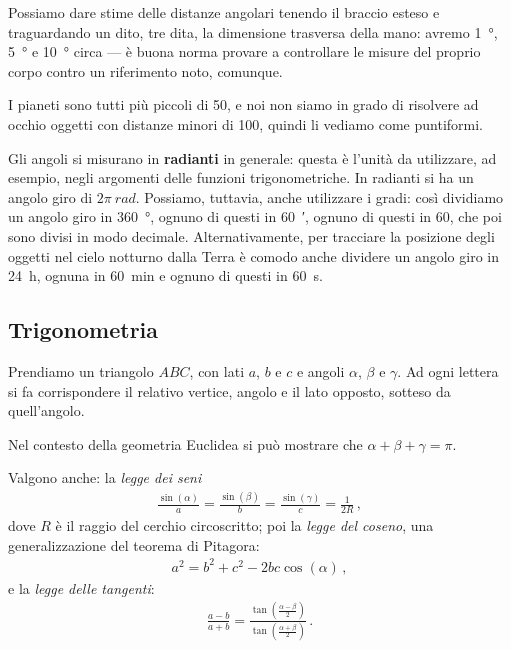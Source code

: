 \documentclass[main.tex]{subfiles}
\begin{document}
Possiamo dare stime delle distanze angolari tenendo il braccio esteso e traguardando un dito, tre dita, la dimensione trasversa della mano: avremo \SI{1}{\degree}, \SI{5}{\degree} e \SI{10}{\degree} circa --- è buona norma provare a controllare le misure del proprio corpo contro un riferimento noto, comunque. 

I pianeti sono tutti più piccoli di \SI{50}{\arcsec}, e noi non siamo in grado di risolvere ad occhio oggetti con distanze minori di \SI{100}{\arcsec}, quindi li vediamo come puntiformi. 

Gli angoli si misurano in \textbf{radianti} in generale: questa è l'unità da utilizzare, ad esempio, negli argomenti delle funzioni trigonometriche. 
In radianti si ha un angolo giro di \(2 \pi \SI{}{rad}\).
Possiamo, tuttavia, anche utilizzare i gradi: così dividiamo un angolo giro in \SI{360}{\degree}, ognuno di questi in \SI{60}{\arcmin}, ognuno di questi in \SI{60}{\arcsec}, che poi sono divisi in modo decimale. 
Alternativamente, per tracciare la posizione degli oggetti nel cielo notturno dalla Terra è comodo anche dividere un angolo giro in \SI{24}{h}, ognuna in \SI{60}{min} e ognuno di questi in \SI{60}{s}. 

\subsection{Trigonometria}

Prendiamo un triangolo \(ABC\), con lati \(a\), \(b\) e \(c\) e angoli \(\alpha \), \(\beta \) e \(\gamma \). Ad ogni lettera si fa corrispondere il relativo vertice, angolo e il lato opposto, sotteso da quell'angolo.

Nel contesto della geometria Euclidea si può mostrare che \(\alpha + \beta + \gamma  =\pi \). 

Valgono anche: la \emph{legge dei seni}
%
\begin{align}
\frac{\sin(\alpha )}{a} = 
\frac{\sin(\beta )}{b} = 
\frac{\sin(\gamma )}{c} =
\frac{1}{2R}
\,,
\end{align}
%
dove \(R\) è il raggio del cerchio circoscritto; poi la \emph{legge del coseno}, una generalizzazione del teorema di Pitagora:
%
\begin{align}
a^2 = b^2 + c^2 - 2bc \cos(\alpha )
\,,
\end{align}
%
e la \emph{legge delle tangenti}: 
%
\begin{align}
\frac{a-b}{a+b} = \frac{\tan(\frac{\alpha - \beta }{2})}{\tan(\frac{\alpha + \beta}{2} )}
\,.
\end{align}
\end{document}

